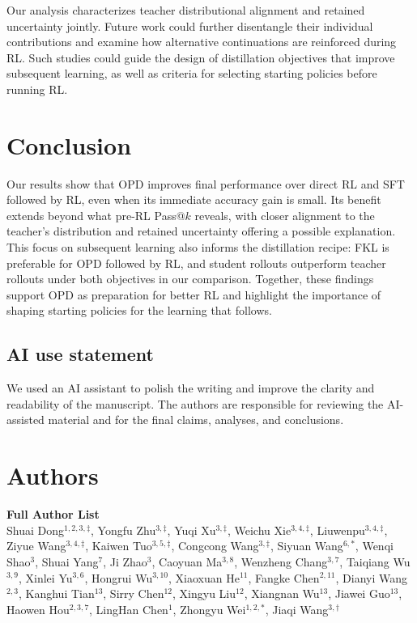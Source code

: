 \documentclass[]{jingdong}
\theoremstyle{plain}
\theoremstyle{definition}
\theoremstyle{remark}
\begin{document}
Our analysis characterizes teacher distributional alignment and retained uncertainty jointly. Future work could further disentangle their individual contributions and examine how alternative continuations are reinforced during RL. Such studies could guide the design of distillation objectives that improve subsequent learning, as well as criteria for selecting starting policies before running RL.

\section{Conclusion}
\label{sec:conclusion}
Our results show that OPD improves final performance over direct RL and SFT followed by RL, even when its immediate accuracy gain is small. Its benefit extends beyond what pre-RL Pass@$k$ reveals, with closer alignment to the teacher's distribution and retained uncertainty offering a possible explanation. This focus on subsequent learning also informs the distillation recipe: FKL is preferable for OPD followed by RL, and student rollouts outperform teacher rollouts under both objectives in our comparison. Together, these findings support OPD as preparation for better RL and highlight the importance of shaping starting policies for the learning that follows.


\subsection*{AI use statement}
We used an AI assistant to polish the writing and improve the clarity and readability of the manuscript. The authors are responsible for reviewing the AI-assisted material and for the final claims, analyses, and conclusions.

\clearpage
\section{Authors}
\label{sec:authors}

\textbf{Full Author List}\\[0.5em]
Shuai Dong$^{1,2,3,\ddagger}$,
Yongfu Zhu$^{3,\ddagger}$,
Yuqi Xu$^{3,\ddagger}$,
Weichu Xie$^{3,4,\ddagger}$,
Liuwenpu$^{3,4,\ddagger}$,
Ziyue Wang$^{3,4,\ddagger}$,
Kaiwen Tuo$^{3,5,\ddagger}$,
Congcong Wang$^{3,\ddagger}$,
Siyuan Wang$^{6,*}$,
Wenqi Shao$^{3}$,
Shuai Yang$^{7}$,
Ji Zhao$^{3}$,
Caoyuan Ma$^{3,8}$,
Wenzheng Chang$^{3,7}$,
Taiqiang Wu$^{3,9}$,
Xinlei Yu$^{3,6}$,
Hongrui Wu$^{3,10}$,
Xiaoxuan He$^{11}$,
Fangke Chen$^{2,11}$,
Dianyi Wang$^{2,3}$,
Kanghui Tian$^{13}$,
Sirry Chen$^{12}$,
Xingyu Liu$^{12}$,
Xiangnan Wu$^{13}$,
Jiawei Guo$^{13}$,
Haowen Hou$^{2,3,7}$,
LingHan Chen$^{1}$,
Zhongyu Wei$^{1,2,*}$,
Jiaqi Wang$^{3,\dagger}$
\end{document}
